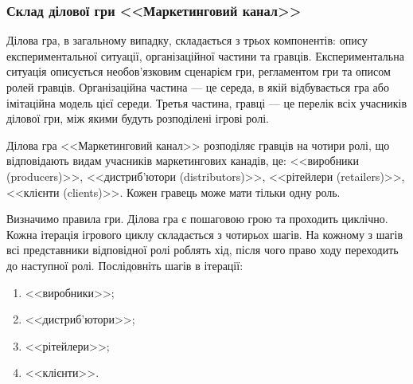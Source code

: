 \subsubsection{Склад ділової гри <<Маркетинговий канал>>}
Ділова гра, в загальному випадку, складається з трьох компонентів: опису експериментальної ситуації, організаційної частини та гравців. Експериментальна ситуація описується необов’язковим сценарієм гри, регламентом гри та описом ролей гравців. Організаційна частина --- це середа, в якій відбувається гра або імітаційна модель цієї середи. Третья частина, гравці --- це перелік всіх учасників ділової гри, між якими будуть розподілені ігрові ролі.

Ділова гра <<Маркетинговий канал>> розподіляє гравців на чотири ролі, що відповідають видам учасників маркетингових канадів, це: <<виробники (producers)>>, <<дистриб’ютори (distributors)>>, <<рітейлери (retailers)>>, <<клієнти (clients)>>. Кожен гравець може мати тільки одну роль.

Визначимо правила гри. Ділова гра є пошаговою грою та проходить циклічно. Кожна ітерація ігрового циклу складається з чотирьох шагів. На кожному з шагів всі представники відповідної ролі роблять хід, після чого право ходу переходить до наступної ролі. Послідовніть шагів в ітерації:
\begin{enumerate} %
\item <<виробники>>;
\item <<дистриб’ютори>>;
\item <<рітейлери>>;
\item <<клієнти>>.
\end{enumerate}

